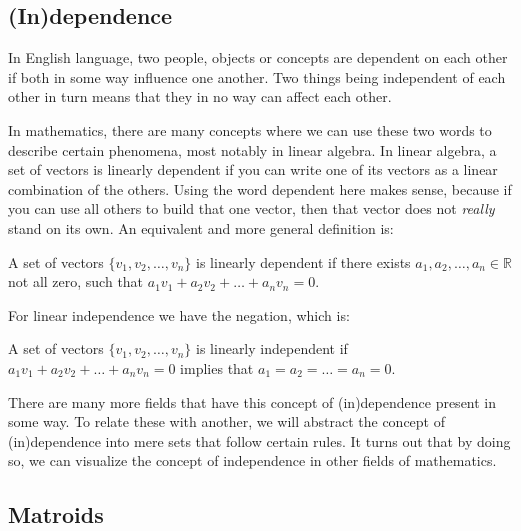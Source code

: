 \subsection{(In)dependence}

In English language, two people, objects or concepts are dependent on each other if both in some way influence one another. Two things being independent of each other in turn means that they in no way can affect each other. 

    In mathematics, there are many concepts where we can use these two words to describe certain phenomena, most notably in linear algebra. In linear algebra, a set of vectors is linearly dependent if you can write one of its vectors as a linear combination of the others. Using the word dependent here makes sense, because if you can use all others to build that one vector, then that vector does not \textit{really} stand on its own. An equivalent and more general definition is:


    \begin{defn}

    A set of vectors $\{v_1,v_2,\dots,v_n\}$ is linearly dependent if there exists $a_1,a_2,\dots,a_n \in \mathbb{R} $ not all zero, such that $a_1v_1+a_2v_2+\dots +a_nv_n = 0.$
    
    \end{defn}




For linear independence we have the negation, which is:
\begin{defn}
    A set of vectors $ \{v_1,v_2,\dots,v_n\}$ is linearly independent if $a_1v_1+a_2v_2+\dots+a_nv_n=0$ implies that $a_1=a_2=\dots=a_n=0.$

\end{defn}
There are many more fields that have this concept of (in)dependence present in some way. To relate these with another, we will abstract the concept of (in)dependence into mere sets that follow certain rules. It turns out that by doing so, we can visualize the concept of independence in other fields of mathematics.






\subsection{Matroids}

